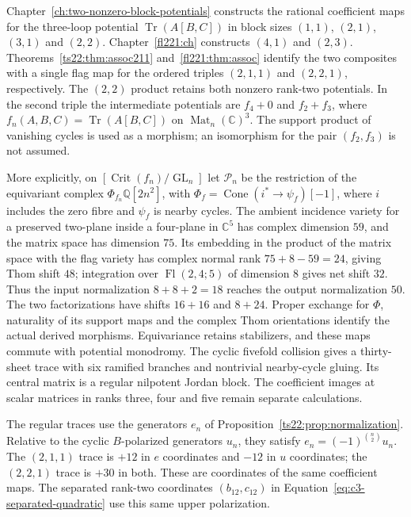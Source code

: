 Chapter~\ref{ch:two-nonzero-block-potentials} constructs the rational
coefficient maps for the three-loop potential $\operatorname{Tr}(A[B,C])$
in block sizes $(1,1)$, $(2,1)$, $(3,1)$ and $(2,2)$.
Chapter~\ref{fl221:ch} constructs $(4,1)$ and $(2,3)$.
Theorems~\ref{ts22:thm:assoc211} and~\ref{fl221:thm:assoc} identify the
two composites with a single flag map for the ordered triples $(2,1,1)$
and $(2,2,1)$, respectively. The $(2,2)$ product retains both nonzero
rank-two potentials. In the second triple the intermediate potentials
are $f_4+0$ and $f_2+f_3$, where
$f_n(A,B,C)=\operatorname{Tr}(A[B,C])$ on $\operatorname{Mat}_n(\mathbb C)^3$.
The support product of vanishing cycles is used as a morphism; an
isomorphism for the pair $(f_2,f_3)$ is not assumed.

More explicitly, on $[\operatorname{Crit}(f_n)/\operatorname{GL}_n]$ let
$\mathcal P_n$ be the restriction of the equivariant complex
$\Phi_{f_n}\mathbb Q[2n^2]$, with
$\Phi_f=\operatorname{Cone}(i^*\to\psi_f)[-1]$, where $i$ includes the zero
fibre and $\psi_f$ is nearby cycles. The ambient incidence variety for a
preserved two-plane inside a four-plane in $\mathbb C^5$ has complex
dimension $59$, and the matrix space has dimension $75$.
Its embedding in the product of the matrix space with the flag variety
has complex normal rank $75+8-59=24$, giving Thom shift $48$; integration over
$\operatorname{Fl}(2,4;5)$ of dimension $8$ gives net shift $32$.
Thus the input normalization $8+8+2=18$ reaches the output normalization
$50$. The two factorizations have shifts $16+16$ and $8+24$.
Proper exchange for $\Phi$, naturality of its support maps and the complex
Thom orientations identify the actual derived morphisms. Equivariance
retains stabilizers, and these maps commute with potential monodromy.
The cyclic fivefold collision gives a thirty-sheet trace with six
ramified branches and nontrivial nearby-cycle gluing. Its central matrix
is a regular nilpotent Jordan block. The coefficient images at scalar
matrices in ranks three, four and five remain separate calculations.

The regular traces use the generators $e_n$ of
Proposition~\ref{ts22:prop:normalization}. Relative to the cyclic
$B$-polarized generators $u_n$, they satisfy
$e_n=(-1)^{\binom n2}u_n$. The $(2,1,1)$ trace is $+12$ in $e$
coordinates and $-12$ in $u$ coordinates; the $(2,2,1)$ trace is
$+30$ in both. These are coordinates of the same coefficient maps.
The separated rank-two coordinates $(b_{12},c_{12})$ in
Equation~\ref{eq:c3-separated-quadratic} use this same upper polarization.

